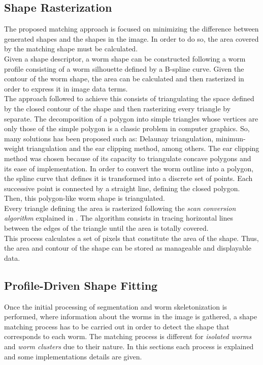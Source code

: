 \subsection{Shape Rasterization}
\label{sec:metrast}

The proposed matching approach is focused on minimizing the difference between generated
shapes and the shapes in the image. In order to do so, the area covered by the matching shape
must be calculated.\\ 
Given a shape descriptor, a worm shape can be
constructed following a worm profile consisting of a worm silhouette defined by 
a B-spline curve. Given the contour of the worm shape, the area can be calculated and 
then rasterized in order to express it in image data terms.\\

The approach followed to achieve this consists of triangulating the space defined by the
closed contour of the shape and then rasterizing every triangle by separate. The
decomposition of a polygon into simple triangles whose vertices are only those of
the simple polygon is a classic problem in computer graphics. So, many solutions
has been proposed such as: Delaunay triangulation, minimun-weight triangulation and
the ear clipping method, among others. The ear clipping method was chosen because
of its capacity to triangulate concave polygons and its ease of implementation.
In order to convert the worm outline into a polygon, the spline curve that defines it 
is transformed into a discrete set of points. Each successive point is connected
by a straight line, defining the closed polygon. Then, this polygon-like worm shape
is triangulated.\\

Every triangle defining the area is rasterized following the \emph{scan conversion algorithm}
explained in \cite{scanconversion}. The algorithm consists in tracing horizontal lines 
between the edges of the triangle until the area is totally covered.\\

This process calculates a set of pixels that constitute the area of the shape. Thus, 
the area and contour of the shape can be stored as manageable and displayable data.


\subsection{Profile-Driven Shape Fitting}
\label{sec:metfit}

Once the initial processing of segmentation and worm skeletonization is performed, where 
information about the worms in the image is gathered, a shape matching process has to be 
carried out in order to detect the shape that corresponds to each worm.
 The matching process is different for
\emph{isolated worms} and \emph{worm clusters}  
due to their nature. In this sections each process is explained and some 
implementations details are given.


